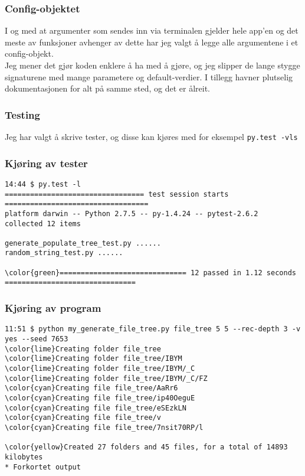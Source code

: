 \documentclass{article}
\newcommand{\code}[1]{\colorbox{codegray}{\texttt{#1}}}
\begin{document}
\subsubsection*{Config-objektet}
  I og med at argumenter som sendes inn via terminalen gjelder
  hele app'en og det meste av funksjoner avhenger av dette
  har jeg valgt å legge alle argumentene i et config-objekt.\\

  Jeg mener det gjør koden enklere å ha med å gjøre, og jeg slipper
  de lange stygge signaturene med mange parametere og default-verdier.
  I tillegg havner plutselig dokumentasjonen for alt på samme sted,
  og det er ålreit.\\



\subsubsection*{Testing}
  Jeg har valgt å skrive tester, og disse kan kjøres med for eksempel
  \code{py.test -vls}


\subsubsection*{Kjøring av tester}
\begin{Verbatim}[commandchars=\\\{\}]
14:44 $ py.test -l
================================= test session starts ==================================
platform darwin -- Python 2.7.5 -- py-1.4.24 -- pytest-2.6.2
collected 12 items

generate_populate_tree_test.py ......
random_string_test.py ......

\color{green}============================== 12 passed in 1.12 seconds ===============================
\end{Verbatim}

\subsubsection*{Kjøring av program}
\begin{Verbatim}[commandchars=\\\{\}]
11:51 $ python my_generate_file_tree.py file_tree 5 5 --rec-depth 3 -v yes --seed 7653
\color{lime}Creating folder file_tree
\color{lime}Creating folder file_tree/IBYM
\color{lime}Creating folder file_tree/IBYM/_C
\color{lime}Creating folder file_tree/IBYM/_C/FZ
\color{cyan}Creating file file_tree/AaRr6
\color{cyan}Creating file file_tree/ip40OeguE
\color{cyan}Creating file file_tree/eSEzkLN
\color{cyan}Creating file file_tree/v
\color{cyan}Creating file file_tree/7nsit70RP/l

\color{yellow}Created 27 folders and 45 files, for a total of 14893 kilobytes
* Forkortet output
\end{Verbatim}
\end{document}

